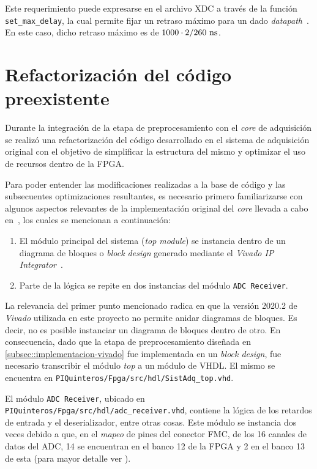 \documentclass[../../main.tex]{subfiles}
\begin{document}
Este requerimiento puede expresarse en el archivo XDC a través de la función \texttt{set\_max\_delay}, la cual permite fijar un retraso máximo para un dado \textit{datapath}~\cite{set-max-delay}. En este caso, dicho retraso máximo es de $1000 \cdot 2/260~\textrm{ns}$.

\section{Refactorización del código preexistente}
Durante la integración de la etapa de preprocesamiento con el \textit{core} de adquisición se realizó una refactorización del código desarrollado en el sistema de adquisición original con el objetivo de simplificar la estructura del mismo y optimizar el uso de recursos dentro de la FPGA.

Para poder entender las modificaciones realizadas a la base de código y las subsecuentes optimizaciones resultantes, es necesario primero familiarizarse con algunos aspectos relevantes de la implementación original del \textit{core} llevada a cabo en~\cite{proyecto-jose}, los cuales se mencionan a continuación:
\begin{enumerate}
    \item El módulo principal del sistema (\textit{top module}) se instancia dentro de un diagrama de bloques o \textit{block design} generado mediante el \textit{Vivado IP Integrator}~\cite{vivado-ip-integrator}.
    \item Parte de la lógica se repite en dos instancias del módulo \texttt{ADC Receiver}.
\end{enumerate}

La relevancia del primer punto mencionado radica en que la versión 2020.2 de \textit{Vivado} utilizada en este proyecto no permite anidar diagramas de bloques. Es decir, no es posible instanciar un diagrama de bloques dentro de otro. En consecuencia, dado que la etapa de preprocesamiento diseñada en \ref{subsec::implementacion-vivado} fue implementada en un \textit{block design}, fue necesario transcribir el módulo \textit{top} a un módulo de VHDL. El mismo se encuentra en \texttt{PIQuinteros/Fpga/src/hdl/SistAdq\_top.vhd}.

El módulo \texttt{ADC Receiver}, ubicado en \texttt{PIQuinteros/Fpga/src/hdl/adc\_receiver.vhd}, contiene la lógica de los retardos de entrada y el deserializador, entre otras cosas. Este módulo se instancia dos veces debido a que, en el \textit{mapeo} de pines del conector FMC, de los 16 canales de datos del ADC, 14 se encuentran en el banco 12 de la FPGA y 2 en el banco 13 de esta (para mayor detalle ver \cite{proyecto-jose}).
\end{document}
